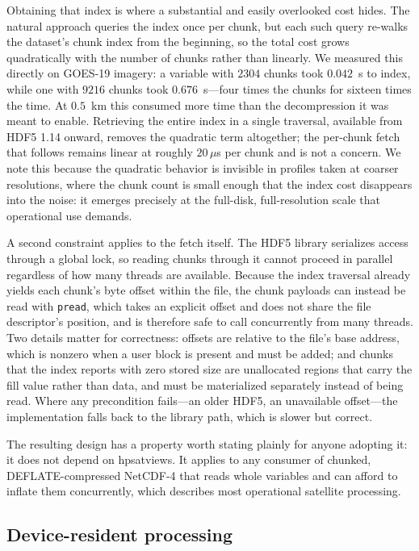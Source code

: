 \documentclass{ametsocV6.1}
\begin{document}
Obtaining that index is where a substantial and easily overlooked cost hides.
The natural approach queries the index once per chunk, but each such query
re-walks the dataset's chunk index from the beginning, so the total cost grows
quadratically with the number of chunks rather than linearly. We measured this
directly on GOES-19 imagery: a variable with $2304$ chunks took $0.042$~s to
index, while one with $9216$ chunks took $0.676$~s---four times the chunks for
sixteen times the time. At $0.5$~km this consumed more time than the
decompression it was meant to enable. Retrieving the entire index in a single
traversal, available from HDF5 1.14 onward, removes the quadratic term
altogether; the per-chunk fetch that follows remains linear at roughly
$20\,\mu$s per chunk and is not a concern. We note this because the quadratic
behavior is invisible in profiles taken at coarser resolutions, where the chunk
count is small enough that the index cost disappears into the noise: it emerges
precisely at the full-disk, full-resolution scale that operational use demands.

A second constraint applies to the fetch itself. The HDF5 library serializes
access through a global lock, so reading chunks through it cannot proceed in
parallel regardless of how many threads are available. Because the index
traversal already yields each chunk's byte offset within the file, the chunk
payloads can instead be read with \texttt{pread}, which takes an explicit
offset and does not share the file descriptor's position, and is therefore safe
to call concurrently from many threads. Two details matter for correctness:
offsets are relative to the file's base address, which is nonzero when a user
block is present and must be added; and chunks that the index reports with zero
stored size are unallocated regions that carry the fill value rather than data,
and must be materialized separately instead of being read. Where any
precondition fails---an older HDF5, an unavailable offset---the implementation
falls back to the library path, which is slower but correct.

The resulting design has a property worth stating plainly for anyone adopting
it: it does not depend on hpsatviews. It applies to any consumer of chunked,
DEFLATE-compressed NetCDF-4 that reads whole variables and can afford to
inflate them concurrently, which describes most operational satellite
processing.

\subsection{Device-resident processing}
\label{sec:device}
\end{document}
